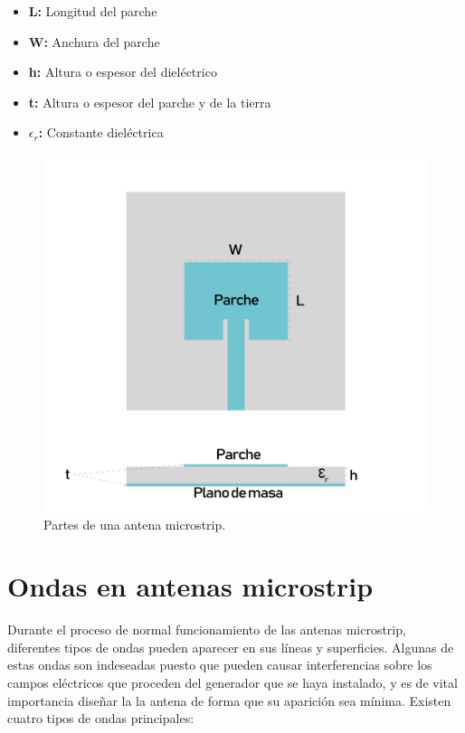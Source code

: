 \begin{itemize}
\item \textbf{L: }Longitud del parche
\item \textbf{W: }Anchura del parche
\item \textbf{h: }Altura o espesor del dieléctrico
\item \textbf{t: }Altura o espesor del parche y de la tierra
\item \textbf{$\epsilon_{r}$: }Constante dieléctrica
\end{itemize}
 
\begin{figure}[h]
    \centering
        \includegraphics[width=15cm]{archivos/parche/elemento}
        \caption{Partes de una antena microstrip.}
        \label{fig:elementos}
\end{figure}

\section{Ondas en antenas microstrip}

\par Durante el proceso de normal funcionamiento de las antenas microstrip, diferentes tipos de ondas pueden aparecer en sus líneas y superficies. Algunas de estas ondas son indeseadas puesto que pueden causar interferencias sobre los campos eléctricos que proceden del generador que se haya instalado, y es de vital importancia diseñar la la antena de forma que su aparición sea mínima. Existen cuatro tipos de ondas principales: \cite{Aquino2008}


